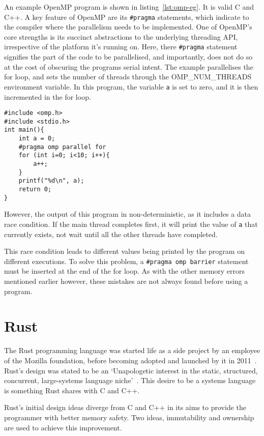 An example OpenMP program is shown in listing~\ref{lst:omp-eg}. It is valid C and C++. A key feature of OpenMP are its \texttt{\#pragma} statements, which indicate to the compiler where the parallelism needs to be implemented.
One of OpenMP's core strengths is its succinct abstractions to the underlying threading API, irrespective of the platform it's running on. Here, there \texttt{\#pragma} statement signifies the part of the code to be parallelised, and importantly, does not do so at the cost of obscuring the programs serial intent.
The example parallelises the for loop, and sets the number of threads through the OMP\_NUM\_THREADS environment variable. In this program, the variable \texttt{a} is set to zero, and it is then incremented in the for loop.

\begin{code}
\begin{verbatim}
#include <omp.h>
#include <stdio.h>
int main(){
    int a = 0;
    #pragma omp parallel for
    for (int i=0; i<10; i++){
        a++;
    }
    printf("%d\n", a);
    return 0;
}
\end{verbatim}
\label{lst:omp-eg}
\end{code}

However, the output of this program in non-deterministic, as it includes a data race condition. If the main thread completes first, it will print the value of \texttt{a} that currently exists, not wait until all the other threads have completed. 

This race condition leads to different values being printed by the program on different executions. To solve this problem, a \texttt{\#pragma omp barrier} statement must be inserted at the end of the for loop. As with the other memory errors mentioned earlier however, these mistakes are not always found before using a program.

\section{Rust}
The Rust programming language was started life as a side project by an employee of the Mozilla foundation, before becoming adopted and launched by it in 2011~\cite{FutureTense}. Rust's design was stated to be an `Unapologetic interest in the static, structured, concurrent, large-systems language niche'~\cite{pServo}. This desire to be a systems language is something Rust shares with C and C++.

Rust's initial design ideas diverge from C and C++ in its aims to provide the programmer with better memory safety. Two ideas, immutability and ownership are used to achieve this improvement. 

